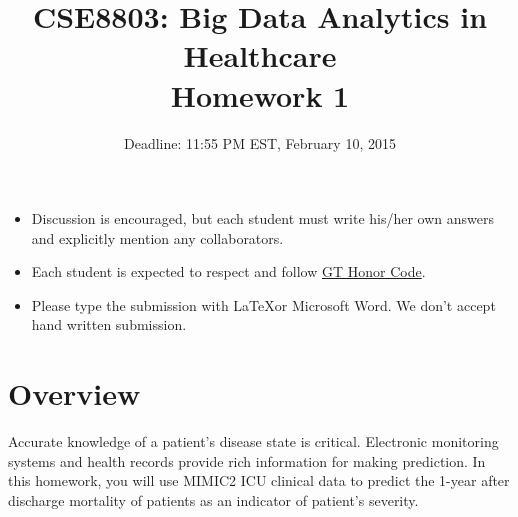\documentclass[12pt]{article}
\title{CSE8803: Big Data Analytics in Healthcare \\ Homework 1}
\author{}
\date{Deadline: 11:55 PM EST, February 10, 2015}
\begin{document}
\maketitle
\begin{itemize}
\item Discussion is encouraged, but each student must write his/her own answers and explicitly mention any collaborators.
\item Each student is expected to respect and follow \href{http://www.honor.gatech.edu/}{ GT Honor Code}.
\item Please type the submission with \LaTeX or Microsoft Word. We don't accept hand written submission.
\end{itemize}

\section*{Overview}
Accurate knowledge of a patient's disease state is critical. Electronic monitoring systems and health records provide rich information for making prediction. In this homework, you will use MIMIC2 ICU clinical data to predict the 1-year after discharge mortality of patients as an indicator of patient's severity.
\end{document}
